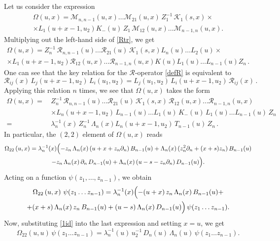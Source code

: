 \documentclass[a4paper,11pt]{article}
\numberwithin{equation}{section}
\begin{document}
Let us consider the expression
\begin{multline*}
    \Omega\left(u,x\right) = \mathcal{M}_{n,n-1}\left(u,x\right) \ldots \mathcal{M}_{21}\left(u,x\right)\,Z_1^{-1}\,\mathcal{K}_1\left(s,x\right) \times \\
    \times L_1\left(u+x-1,u_2\right) K_-(u)\,Z_1\,\mathcal{M}_{12}\left(u,x\right) \ldots \mathcal{M}_{n-1,n}\left(u,x\right) .
\end{multline*}
Multiplying out the left-hand side of \eqref{Rtr}, we get
\begin{multline*}
    \Omega\left(u,x\right) = Z_n^{-1}\,\mathcal{R}_{n,n-1}(u) \ldots \mathcal{R}_{21}(u)\,\mathcal{K}_1\left(s,x\right) L_n(u) \ldots L_2(u) \times \\
    \times L_1\left(u+x-1,u_2\right) \mathcal{R}_{12}\left(u,x\right) \ldots \mathcal{R}_{n-1,n}\left(u,x\right) K(u) L_1(u) \ldots L_{n-1}(u) Z_n \,.
\end{multline*} 
One can see that the key relation for the $\mathcal{R}$-operator \eqref{defR} is equivalent to
\begin{equation*}
    \mathcal{R}_{ij}(x) \, L_j(u+x-1, u_2) \, 
    L_i(u_1, u_2) =  
    L_j(u_1, u_2) \, L_i(u+x-1, u_2) \, 
    \mathcal{R}_{ij}(x) \,.
\end{equation*}
Applying this relation $n$ times, we see that $\Omega\left(u,x\right)$ takes the form
\begin{align*}
    \Omega\left(u,x\right) = \, & Z_n^{-1}\,\mathcal{R}_{n,n-1}(u) \ldots \mathcal{R}_{21}(u)\,\mathcal{K}_1\left(s,x\right)\,\mathcal{R}_{12}\left(u,x\right) \ldots \mathcal{R}_{n-1,n}\left(u,x\right) \\
    &
    \times L_n\left(u+x-1,u_2\right)\,L_{n-1}(u) \ldots L_1(u)\,K_-(u)\,L_1(u) \ldots L_{n-1}(u)\,Z_n \\
    = \, & \lambda_n^{-1}(x)\,Z_n^{-1}\,\Lambda_n(x)L_n\left(u+x-1,u_2\right)\,T_{n-1}(u)\,Z_n \,.
\end{align*}
In particular, the $(2,2)$ element of $\Omega\left(u,x\right)$ reads
\begin{multline*}
    \Omega_{22}\left(u,x\right) = \lambda_n^{-1}(x)\Bigl(- z_n\,\Lambda_n(x)\,(u+x+z_n\partial_n)\,B_{n-1}(u)+\Lambda_n(x)\,(z_n^2\partial_n+(x+s)z_n)\,B_{n-1}(u) \\
    - z_n\,\Lambda_n(x)\,\partial_n\,D_{n-1}(u)+\Lambda_n(x)\,(u-s-z_n\partial_n)\,D_{n-1}(u)\Bigr) .
\end{multline*} 
Acting on a function $\psi(z_1, \ldots, z_{n-1})$, we obtain
\begin{multline*}
    \Omega_{22}\left(u,x\right)\,\psi(z_1 \ldots z_{n-1}) = \lambda_n^{-1}(x)\Bigl(-(u+x)\, z_n\,\Lambda_n(x)\,B_{n-1}(u) + \\ 
    + (x+s)\,\Lambda_n(x)\,z_n\,B_{n-1}(u) + (u-s)\,\Lambda_n(x)\,D_{n-1}(u)\Bigr)\,\psi(z_1 \ldots z_{n-1}) .
\end{multline*} 
Now, substituting \eqref{1id} into the last expression and setting $x = u$, we get
\begin{equation}\label{D1}
    \Omega_{22}\left(u,u\right)\,\psi(z_1 \ldots z_{n-1}) = \lambda_n^{-1}(u)\,u_2^{-1}\,D_n(u)\,\Lambda_n(u)\,\psi(z_1 \ldots z_{n-1}) .
\end{equation}
\end{document}
